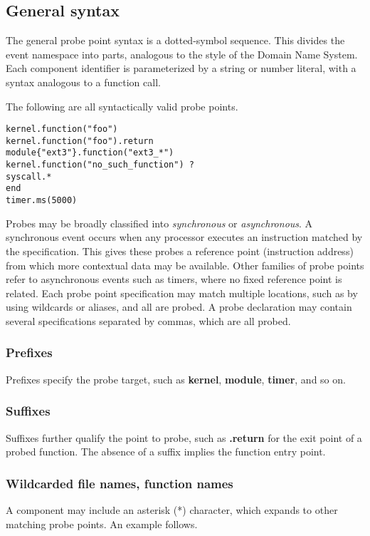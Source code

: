 \documentclass[twoside,english]{article}
\newenvironment{vindent}
{\begin{list}{}{\setlength{\listparindent}{6pt}}
\item[]}
{\end{list}}
\begin{document}
\subsection{General syntax}
The general probe point syntax is a dotted-symbol sequence. This divides
the event namespace into parts, analogous to the style of the Domain Name
System. Each component identifier is parameterized by a string or number
literal, with a syntax analogous to a function call.

The following are all syntactically valid probe points.

\begin{vindent}
\begin{verbatim}
kernel.function("foo")
kernel.function("foo").return
module{"ext3"}.function("ext3_*")
kernel.function("no_such_function") ?
syscall.*
end
timer.ms(5000)
\end{verbatim}
\end{vindent}

Probes may be broadly classified into \emph{synchronous}
or \emph{asynchronous}. A synchronous event occurs when
any processor executes an instruction matched by the specification. This
gives these probes a reference point (instruction address) from which more
contextual data may be available. Other families of probe points refer to
asynchronous events such as timers, where no fixed reference point is related.
Each probe point specification may match multiple locations, such as by using
wildcards or aliases, and all are probed. A probe declaration may contain
several specifications separated by commas, which are all probed.

\subsubsection{Prefixes}
Prefixes specify the probe target, such as \textbf{kernel}, \textbf{module},
\textbf{timer}, and so on.

\subsubsection{Suffixes}
Suffixes further qualify the point to probe, such as \textbf{.return} for the
exit point of a probed function. The absence of a suffix implies the function
entry point.

\subsubsection{Wildcarded file names, function names}
A component may include an asterisk ({*}) character, which expands to other
matching probe points. An example follows.
\end{document}
